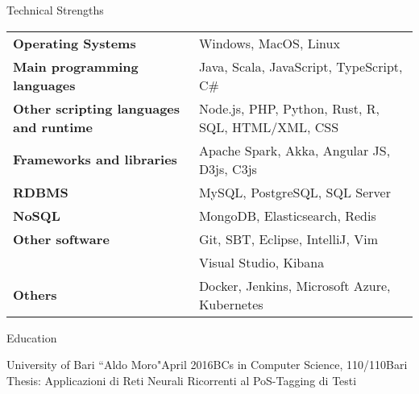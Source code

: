 \documentclass{resume} %
\begin{document}

\begin{rSection}{Technical Strengths}

\begin{tabular}{ @{} >{\bfseries}l @{\hspace{6ex}} l }
Operating Systems & Windows, MacOS, Linux \\
Main programming languages & Java, Scala, JavaScript, TypeScript, C\# \\
Other scripting languages and runtime & Node.js, PHP, Python, Rust, R, SQL, HTML/XML, CSS \\
Frameworks and libraries & Apache Spark, Akka, Angular JS, D3js, C3js \\
RDBMS & MySQL, PostgreSQL, SQL Server \\
NoSQL & MongoDB, Elasticsearch, Redis \\
Other software & Git, SBT, Eclipse, IntelliJ, Vim \\
& Visual Studio, Kibana \\
Others & Docker, Jenkins, Microsoft Azure, Kubernetes \\
\end{tabular}

\end{rSection}


\begin{rSection}{Education}

\begin{rSubsection}{University of Bari ``Aldo Moro"}{April 2016}{BCs in Computer Science, 110/110}{Bari}
Thesis: Applicazioni di Reti Neurali Ricorrenti al PoS-Tagging di Testi
\end{rSubsection}

\end{rSection}
\end{document}
